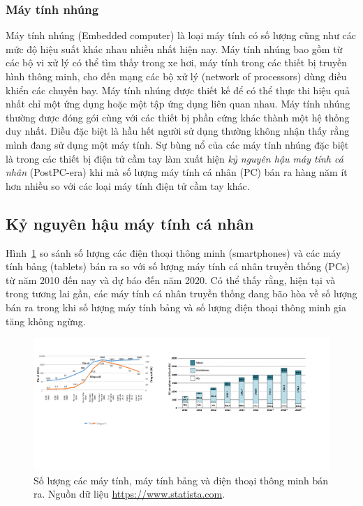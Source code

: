 \subsubsection{Máy tính nhúng}
Máy tính nhúng (Embedded computer) là loại máy tính có số lượng cũng như các mức độ hiệu suất khác nhau nhiều nhất hiện nay. Máy tính nhúng bao gồm từ các bộ vi xử lý có thể tìm thấy trong xe hơi, máy tính trong các thiết bị truyền hình thông minh, cho đến mạng các bộ xử lý (network of processors) dùng điều khiển các chuyến bay. Máy tính nhúng được thiết kế để có thể thực thi hiệu quả nhất chỉ một ứng dụng hoặc một tập ứng dụng liên quan nhau. Máy tính nhúng thường được đóng gói cùng với các thiết bị phần cứng khác thành một hệ thống duy nhất. Điều đặc biệt là hầu hết người sử dụng thường không nhận thấy rằng mình đang sử dụng một máy tính. Sự bùng nổ của các máy tính nhúng đặc biệt là trong các thiết bị điện tử cầm tay làm xuất hiện \emph{kỷ nguyên hậu máy tính cá nhân} (PostPC-era) khi mà số lượng máy tính cá nhân (PC) bán ra hàng năm ít hơn nhiều so với các loại máy tính điện tử cầm tay khác.

\subsection{Kỷ nguyên hậu máy tính cá nhân}
Hình~\ref{fig:PostPC_chart} so sánh số lượng các điện thoại thông minh (smartphones) và các máy tính bảng (tablets) bán ra so với số lượng máy tính cá nhân truyền thống (PCs) từ năm 2010 đến nay và dự báo đến năm 2020. Có thể thấy rằng, hiện tại và trong tương lai gần, các máy tính cá nhân truyền thống đang bão hòa về số lượng bán ra trong khi số lượng máy tính bảng và số lượng điện thoại thông minh gia tăng không ngừng.

\begin{figure}[!h]
	\centering
		\includegraphics[width=0.95\columnwidth]{chapter01/figure/PostPC_chart.pdf}
		\centering
	\caption{Số lượng các máy tính, máy tính bảng và điện thoại thông minh bán ra. Nguồn dữ liệu \url{https://www.statista.com}.}
	\label{fig:PostPC_chart}
\end{figure}

